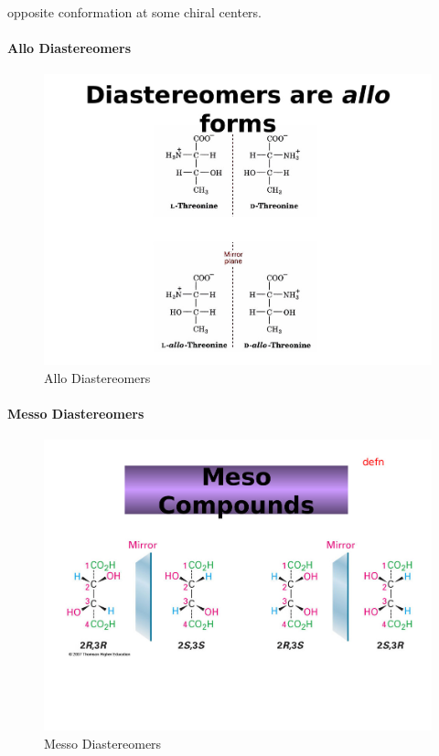 \documentclass[]{article}
\let\oldparagraph\paragraph
\renewcommand{\paragraph}[1]{\oldparagraph{#1}\mbox{}}
\begin{document}
opposite conformation at some chiral centers.

\hypertarget{allo-diastereomers}{%
\paragraph{Allo Diastereomers}\label{allo-diastereomers}}

\begin{figure}
\centering
\includegraphics{Images/AlloDiastereomers.jpg}
\caption{Allo Diastereomers}
\end{figure}

\hypertarget{messo-diastereomers}{%
\paragraph{Messo Diastereomers}\label{messo-diastereomers}}

\begin{figure}
\centering
\includegraphics{Images/MessoCompounds.jpg}
\caption{Messo Diastereomers}
\end{figure}
\end{document}
